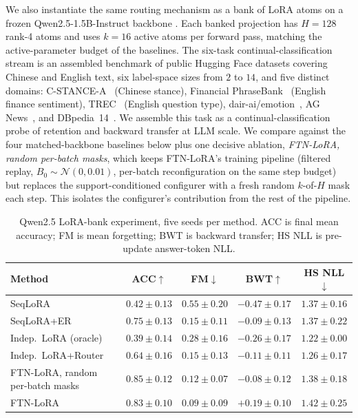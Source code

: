 \documentclass[11pt]{article}
\begin{document}
We also instantiate the same routing mechanism as a bank of LoRA atoms \citep{hu2022lora} on a frozen Qwen2.5-1.5B-Instruct backbone \citep{qwen2_5_2024}. Each banked projection has $H=128$ rank-4 atoms and uses $k=16$ active atoms per forward pass, matching the active-parameter budget of the baselines. The six-task continual-classification stream is an assembled benchmark of public Hugging Face datasets covering Chinese and English text, six label-space sizes from $2$ to $14$, and five distinct domains: C-STANCE-A~\citep{zhao2024cstance} (Chinese stance), Financial PhraseBank~\citep{malo2014finphrasebank} (English finance sentiment), TREC~\citep{li2002trec} (English question type), dair-ai/emotion~\citep{saravia2018emotion}, AG News~\citep{zhang2015charcnn}, and DBpedia~14~\citep{zhang2015charcnn}. We assemble this task as a continual-classification probe of retention and backward transfer at LLM scale. We compare against the four matched-backbone baselines below plus one decisive ablation, \emph{FTN-LoRA, random per-batch masks}, which keeps FTN-LoRA's training pipeline (filtered replay, $B_0\sim\mathcal{N}(0,0.01)$, per-batch reconfiguration on the same step budget) but replaces the support-conditioned configurer with a fresh random $k$-of-$H$ mask each step. This isolates the configurer's contribution from the rest of the pipeline.

\begin{table}[t]
\centering
\small
\setlength{\tabcolsep}{5pt}
\caption{Qwen2.5 LoRA-bank experiment, five seeds per method. ACC is final mean accuracy; FM is mean forgetting; BWT is backward transfer; HS NLL is pre-update answer-token NLL.}
\begin{tabular}{lcccc}
\toprule
Method & ACC$\uparrow$ & FM$\downarrow$ & BWT$\uparrow$ & HS NLL$\downarrow$ \\
\midrule
SeqLoRA & $0.42\pm0.13$ & $0.55\pm0.20$ & $-0.47\pm0.17$ & $1.37\pm0.16$ \\
SeqLoRA+ER & $0.75\pm0.13$ & $0.15\pm0.11$ & $-0.09\pm0.13$ & $1.37\pm0.22$ \\
Indep.\ LoRA (oracle) & $0.39\pm0.14$ & $0.28\pm0.16$ & $-0.26\pm0.17$ & $1.22\pm0.00$ \\
Indep.\ LoRA+Router & $0.64\pm0.16$ & $0.15\pm0.13$ & $-0.11\pm0.11$ & $1.26\pm0.17$ \\
FTN-LoRA, random per-batch masks & $\mathbf{0.85\pm0.12}$ & $\mathbf{0.12\pm0.07}$ & $-0.08\pm0.12$ & $1.38\pm0.18$ \\
FTN-LoRA & $0.83\pm0.10$ & $0.09\pm0.09$ & $\mathbf{+0.19\pm0.10}$ & $1.42\pm0.25$ \\
\bottomrule
\end{tabular}
\label{tab:lora_main}
\end{table}
\end{document}
